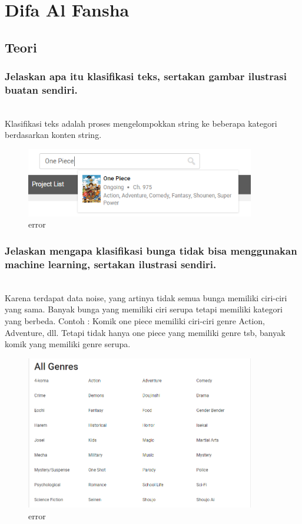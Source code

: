 \section{Difa Al Fansha}

\subsection{Teori}
	
	\subsubsection{Jelaskan apa itu klasiﬁkasi teks, sertakan gambar ilustrasi buatan sendiri.}\hfill\\
Klasifikasi teks adalah proses mengelompokkan string ke beberapa kategori berdasarkan konten string.

	\begin{figure}[H]
		\begin{center}
		 \includegraphics[width=10cm]{figures/1174076/figures4/1.png}
		 \caption{error}	
		\end{center}
	\end{figure}

	\subsubsection{Jelaskan mengapa klasiﬁkasi bunga tidak bisa menggunakan machine learning, sertakan ilustrasi sendiri.}\hfill\\
Karena terdapat data noise, yang artinya tidak semua bunga memiliki ciri-ciri yang sama. Banyak bunga yang memiliki ciri serupa tetapi memiliki kategori yang berbeda.
Contoh : Komik one piece memiliki ciri-ciri genre Action, Adventure, dll. Tetapi tidak hanya one piece yang memiliki genre tsb, banyak komik yang memiliki genre serupa.
	\begin{figure}[H]
		\begin{center}
		 \includegraphics[width=10cm]{figures/1174076/figures4/2.png}
		 \caption{error}	
		\end{center}
	\end{figure}

